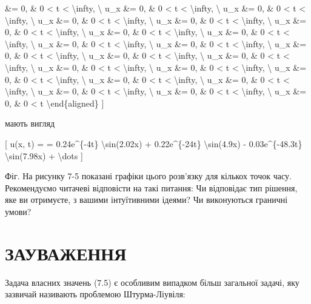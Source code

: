 \documentclass[
]{article}
\begin{document}
\&= 0, \& 0 \textless{} t \textless{} \textbackslash infty,
\textbackslash{} u\_x \&= 0, \& 0 \textless{} t \textless{}
\textbackslash infty, \textbackslash{} u\_x \&= 0, \& 0 \textless{} t
\textless{} \textbackslash infty, \textbackslash{} u\_x \&= 0, \& 0
\textless{} t \textless{} \textbackslash infty, \textbackslash{} u\_x
\&= 0, \& 0 \textless{} t \textless{} \textbackslash infty,
\textbackslash{} u\_x \&= 0, \& 0 \textless{} t \textless{}
\textbackslash infty, \textbackslash{} u\_x \&= 0, \& 0 \textless{} t
\textless{} \textbackslash infty, \textbackslash{} u\_x \&= 0, \& 0
\textless{} t \textless{} \textbackslash infty, \textbackslash{} u\_x
\&= 0, \& 0 \textless{} t \textless{} \textbackslash infty,
\textbackslash{} u\_x \&= 0, \& 0 \textless{} t \textless{}
\textbackslash infty, \textbackslash{} u\_x \&= 0, \& 0 \textless{} t
\textless{} \textbackslash infty, \textbackslash{} u\_x \&= 0, \& 0
\textless{} t \textless{} \textbackslash infty, \textbackslash{} u\_x
\&= 0, \& 0 \textless{} t \textless{} \textbackslash infty,
\textbackslash{} u\_x \&= 0, \& 0 \textless{} t \textless{}
\textbackslash infty, \textbackslash{} u\_x \&= 0, \& 0 \textless{} t
\textless{} \textbackslash infty, \textbackslash{} u\_x \&= 0, \& 0
\textless{} t \textless{} \textbackslash infty, \textbackslash{} u\_x
\&= 0, \& 0 \textless{} t \textless{} \textbackslash infty,
\textbackslash{} u\_x \&= 0, \& 0 \textless{} t \textless{}
\textbackslash infty, \textbackslash{} u\_x \&= 0, \& 0 \textless{} t
\textless{} \textbackslash infty, \textbackslash{} u\_x \&= 0, \& 0
\textless{} t \textless{} \textbackslash infty, \textbackslash{} u\_x
\&= 0, \& 0 \textless{} t \textbackslash end\{aligned\} {]}

мають вигляд

{[} u(x, t) = = 0.24e\^{}\{-4t\} \textbackslash sin(2.02x) +
0.22e\^{}\{-24t\} \textbackslash sin(4.9x) - 0.03e\^{}\{-48.3t\}
\textbackslash sin(7.98x) + \textbackslash dots {]}

Фіг. На рисунку 7-5 показані графіки цього розв'язку для кількох точок
часу. Рекомендуємо читачеві відповісти на такі питання: Чи відповідає
тип рішення, яке ви отримуєте, з вашими інтуїтивними ідеями? Чи
виконуються граничні умови?

\section{ЗАУВАЖЕННЯ}\label{ux437ux430ux443ux432ux430ux436ux435ux43dux43dux44f-3}

Задача власних значень (7.5) є особливим випадком більш загальної
задачі, яку зазвичай називають проблемою Штурма-Ліувіля:
\end{document}
